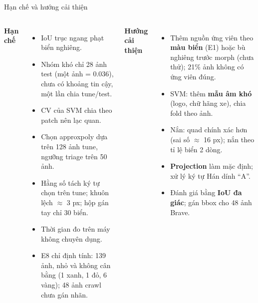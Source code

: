 \documentclass[aspectratio=169,11pt]{beamer}
\newcommand{\code}[1]{{\footnotesize\ttfamily #1}}
\newcommand{\hl}[1]{\textcolor{accentdark}{\textbf{#1}}}
\begin{document}
\begin{frame}{Hạn chế và hướng cải thiện}
  \begin{columns}[T]
    {\bfseries\color{accentdark}Hạn chế}
    \begin{itemize}
      \item IoU trục ngang phạt biển nghiêng.
      \item Nhóm khó chỉ 28 ảnh test (một ảnh = 0.036), chưa có khoảng tin cậy, một lần chia tune/test.
      \item CV của SVM chia theo patch nên lạc quan.
      \item Chọn \code{approxpoly} dựa trên 128 ảnh tune, ngưỡng triage trên 50 ảnh.
      \item Hằng số tách ký tự chọn trên tune; khuôn lệch $\approx$ 3 px; hộp gán tay chỉ 30 biển.
      \item Thời gian đo trên máy không chuyên dụng.
      \item E8 chỉ định tính: 139 ảnh, nhỏ và không cân bằng (1 xanh, 1 đỏ, 6 vàng); 48 ảnh crawl chưa gán nhãn.
    \end{itemize}
    {\bfseries\color{accentdark}Hướng cải thiện}
    \begin{itemize}
      \item Thêm nguồn ứng viên theo \hl{màu biển} (E1) hoặc bù nghiêng trước morph (chưa thử); 21\% ảnh không có ứng viên đúng.
      \item SVM: thêm \hl{mẫu âm khó} (logo, chữ hãng xe), chia fold theo ảnh.
      \item Nắn: quad chính xác hơn (sai số $\approx$ 16 px); nắn theo tỉ lệ biển 2 dòng.
      \item \hl{Projection} làm mặc định; xử lý ký tự Hán dính ``A''.
      \item Đánh giá bằng \hl{IoU đa giác}; gán bbox cho 48 ảnh Brave.
    \end{itemize}
  \end{columns}
\end{frame}
\end{document}
